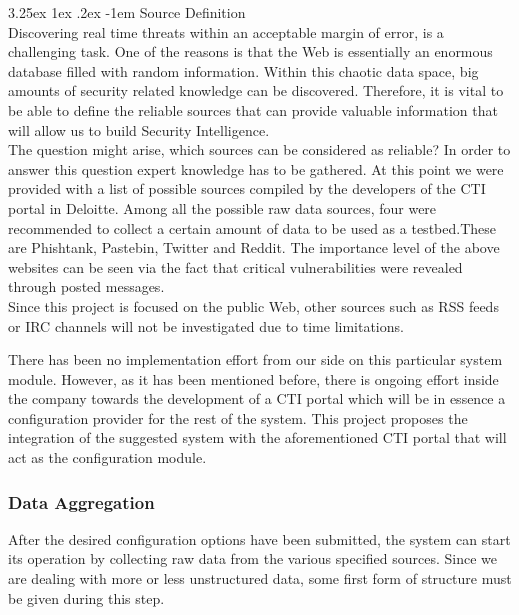 \documentclass[12pt]{article}
\makeatletter
\newcounter{subsubsubsection}[subsubsection]
\renewcommand\paragraph{\@startsection{paragraph}{5}{\z@}%
  {3.25ex \@plus1ex \@minus.2ex}%
  {-1em}%
  {\normalfont\normalsize\bfseries}}
\makeatother
\begin{document}
\paragraph{Source Definition}
\hfill \break \\
Discovering real time threats within an acceptable margin of error, is a challenging task. One of the reasons is that the Web is essentially an enormous database filled with random information. Within this chaotic data space, big amounts of security related knowledge can be discovered. Therefore, it is vital to be able to define the reliable sources that can provide valuable information that will allow us to build Security Intelligence. 
\hfill \break \\
The question might arise, which sources can be considered as reliable? In order to answer this question expert knowledge has to be gathered. At this point we were provided with a list of possible sources compiled by the developers of the CTI portal in Deloitte. Among all the possible raw data sources, four were recommended to collect a certain amount of data to be used as a testbed.These are Phishtank, Pastebin, Twitter and Reddit. The importance level of the above websites can be seen via the fact that critical vulnerabilities were revealed through posted messages\cite{list-2015-attacks}.
\hfill \break \\ 
Since this project is focused on the public Web, other sources such as RSS feeds or IRC channels will not be investigated due to time limitations.   

There has been no implementation effort from our side on this particular system module. However, as it has been mentioned before, there is ongoing effort inside the company towards the development of a CTI portal which will be in essence a configuration provider for the rest of the system. This project proposes the integration of the suggested system with the aforementioned CTI portal that will act as the configuration module. 


\subsubsection{Data Aggregation}

After the desired configuration options have been submitted, the  system can start its operation by collecting raw data from the various specified sources. Since we are dealing with more or less unstructured data, some first form of structure must be given during this step.
\end{document}
